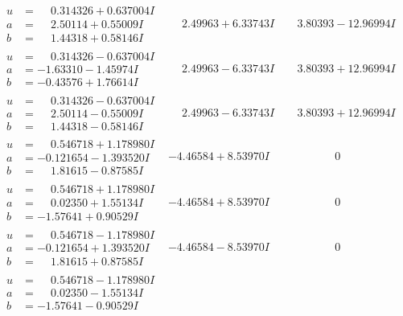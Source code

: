 \documentclass[1p]{elsarticle_modified}
\theoremstyle{definition}
\begin{document}
$$\begin{array}{c|c|c}
\begin{aligned}
u &= \phantom{-}0.314326 + 0.637004 I \\
a &= \phantom{-}2.50114 + 0.55009 I \\
b &= \phantom{-}1.44318 + 0.58146 I\end{aligned}
 & \phantom{-}2.49963 + 6.33743 I & \phantom{-}3.80393 - 12.96994 I \\ \hline\begin{aligned}
u &= \phantom{-}0.314326 - 0.637004 I \\
a &= -1.63310 - 1.45974 I \\
b &= -0.43576 + 1.76614 I\end{aligned}
 & \phantom{-}2.49963 - 6.33743 I & \phantom{-}3.80393 + 12.96994 I \\ \hline\begin{aligned}
u &= \phantom{-}0.314326 - 0.637004 I \\
a &= \phantom{-}2.50114 - 0.55009 I \\
b &= \phantom{-}1.44318 - 0.58146 I\end{aligned}
 & \phantom{-}2.49963 - 6.33743 I & \phantom{-}3.80393 + 12.96994 I \\ \hline\begin{aligned}
u &= \phantom{-}0.546718 + 1.178980 I \\
a &= -0.121654 - 1.393520 I \\
b &= \phantom{-}1.81615 - 0.87585 I\end{aligned}
 & -4.46584 + 8.53970 I & \phantom{-0.000000 } 0 \\ \hline\begin{aligned}
u &= \phantom{-}0.546718 + 1.178980 I \\
a &= \phantom{-}0.02350 + 1.55134 I \\
b &= -1.57641 + 0.90529 I\end{aligned}
 & -4.46584 + 8.53970 I & \phantom{-0.000000 } 0 \\ \hline\begin{aligned}
u &= \phantom{-}0.546718 - 1.178980 I \\
a &= -0.121654 + 1.393520 I \\
b &= \phantom{-}1.81615 + 0.87585 I\end{aligned}
 & -4.46584 - 8.53970 I & \phantom{-0.000000 } 0 \\ \hline\begin{aligned}
u &= \phantom{-}0.546718 - 1.178980 I \\
a &= \phantom{-}0.02350 - 1.55134 I \\
b &= -1.57641 - 0.90529 I\end{aligned}

\end{array}$$
\end{document}
